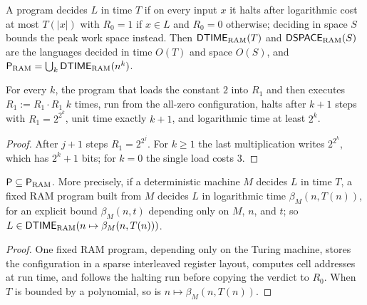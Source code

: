 \begin{definition}
  \label{def:models-ram-classes}
  \leanok
  A program decides $L$ in time $T$ if on every input $x$ it halts after
  logarithmic cost at most $T(|x|)$ with $R_0 = 1$ if $x \in L$ and $R_0 = 0$
  otherwise; deciding in space $S$ bounds the peak work space instead. Then
  $\mathsf{DTIME}_{\mathrm{RAM}}(T)$ and $\mathsf{DSPACE}_{\mathrm{RAM}}(S)$ are the
  languages decided in time $O(T)$ and space $O(S)$, and
  $\mathsf{P}_{\mathrm{RAM}} = \bigcup_k \mathsf{DTIME}_{\mathrm{RAM}}(n^k)$.
\end{definition}

\begin{theorem}
  \label{thm:models-ram-log-gap}
  \leanok
  For every $k$, the program that loads the constant $2$ into $R_1$ and then
  executes $R_1 := R_1 \cdot R_1$ $k$ times, run from the all-zero
  configuration, halts after $k + 1$ steps with $R_1 = 2^{2^k}$, unit time
  exactly $k + 1$, and logarithmic time at least $2^k$.
\end{theorem}
\begin{proof}
  \leanok
  After $j + 1$ steps $R_1 = 2^{2^j}$. For $k \ge 1$ the last multiplication
  writes $2^{2^k}$, which has $2^k + 1$ bits; for $k = 0$ the single load
  costs $3$.
\end{proof}

\begin{theorem}
  \label{thm:models-p-subset-ram-p}
  \leanok
  $\mathsf{P} \subseteq \mathsf{P}_{\mathrm{RAM}}$. More precisely, if a
  deterministic machine $M$ decides $L$ in time $T$, a fixed RAM program
  built from $M$ decides $L$ in logarithmic time $\beta_M(n, T(n))$, for an
  explicit bound $\beta_M(n, t)$ depending only on $M$, $n$, and $t$; so
  $L \in \mathsf{DTIME}_{\mathrm{RAM}}(n \mapsto \beta_M(n, T(n)))$.
\end{theorem}
\begin{proof}
  \leanok
  One fixed RAM program, depending only on the Turing machine, stores the
  configuration in a sparse interleaved register layout, computes cell
  addresses at run time, and follows the halting run before copying the verdict
  to $R_0$. When $T$ is bounded by a polynomial, so is
  $n \mapsto \beta_M(n, T(n))$.
\end{proof}

